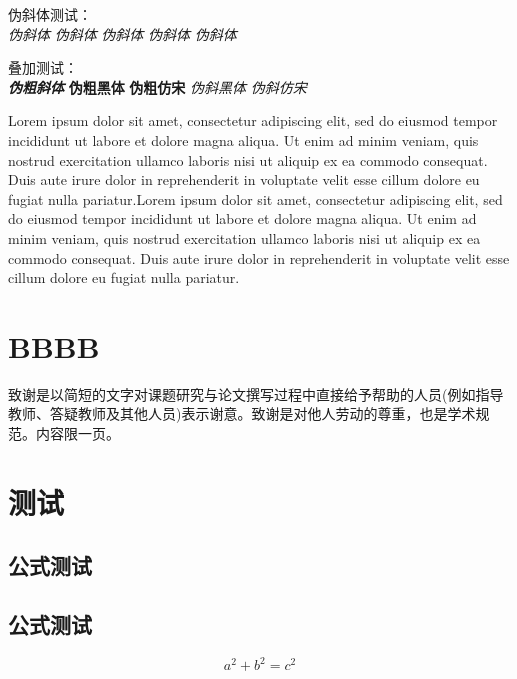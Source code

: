\documentclass[type = bachelor]{whu-thesis}
\begin{document}
伪斜体测试：\\
{\itshape\songti 伪斜体} {\itshape\kaishu 伪斜体} {\itshape\heiti 伪斜体} {\itshape\fangsong 伪斜体} {\itshape 伪斜体}

叠加测试：\\
{\bfseries\itshape 伪粗斜体} {\bfseries\sffamily 伪粗黑体} {\bfseries\ttfamily 伪粗仿宋} {\itshape\sffamily 伪斜黑体} {\itshape\ttfamily 伪斜仿宋}

Lorem ipsum dolor sit amet, consectetur adipiscing elit, sed do eiusmod tempor incididunt ut labore et dolore magna aliqua. Ut enim ad minim veniam, quis nostrud exercitation ullamco laboris nisi ut aliquip ex ea commodo consequat. Duis aute irure dolor in reprehenderit in voluptate velit esse cillum dolore eu fugiat nulla pariatur.Lorem ipsum dolor sit amet, consectetur adipiscing elit, sed do eiusmod tempor incididunt ut labore et dolore magna aliqua. Ut enim ad minim veniam, quis nostrud exercitation ullamco laboris nisi ut aliquip ex ea commodo consequat. Duis aute irure dolor in reprehenderit in voluptate velit esse cillum dolore eu fugiat nulla pariatur.

\chapter{BBBB}


\printbibliography

\begin{acknowledgements}
  致谢是以简短的文字对课题研究与论文撰写过程中直接给予帮助的人员(例如指导教师、答疑教师及其他人员)表示谢意。致谢是对他人劳动的尊重，也是学术规范。内容限一页。
\end{acknowledgements}

\appendix

\chapter{测试}

\section{公式测试}
\section{公式测试}

\begin{equation}
  a^2 + b^2 = c^2
\end{equation}
\end{document}

